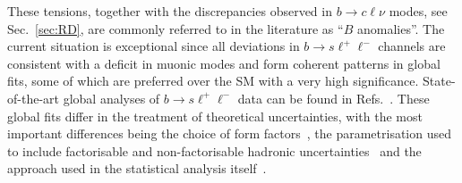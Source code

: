 \documentclass[10pt]{article}
\begin{document}
These tensions, together with the discrepancies observed in $b\to c\ell\nu$ modes, see Sec.~\ref{sec:RD}, are commonly referred to in the literature as ``$B$ anomalies''. The current situation is exceptional since all deviations in $b\to s\ell^+\ell^-$ channels are consistent with a deficit in muonic modes and form coherent patterns in global fits, some of which are preferred over the SM with a very high significance. State-of-the-art global analyses of $b\to s\ell^+\ell^-$ data can be found in Refs.~\cite{Altmannshofer:2021qrr,Alguero:2021anc,Hurth:2021nsi,Cornella:2021sby,Geng:2021nhg,Ciuchini:2020gvn,Alda:2020okk,Hurth:2020ehu}. These global fits differ in the treatment of theoretical uncertainties, with the most important differences being the choice of form factors~\cite{Khodjamirian:2010vf,Straub:2015ica,Gubernari:2018wyi}, the parametrisation used to include factorisable and non-factorisable hadronic uncertainties~\cite{Jager:2012uw,Capdevila:2017ert,Ciuchini:2015qxb,Chobanova:2017ghn} and the approach used in the statistical analysis itself~\cite{DescotesGenon:2012zf,Altmannshofer:2014rta,Hurth:2016fbr,Albrecht:2018vsa,Ciuchini:2019usw,Bhom:2020lmk}.
\end{document}
